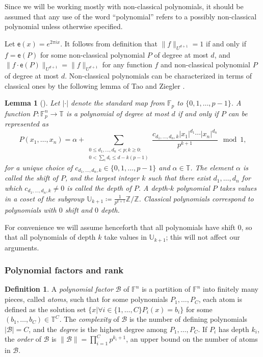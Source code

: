 \documentclass{article}
\theoremstyle{plain}
\newtheorem{lem}[theorem]{Lemma}
\theoremstyle{definition}
\theoremstyle{definition}
\newtheorem{defn}[theorem]{Definition}
\theoremstyle{remark}
\numberwithin{equation}{section}
\newcommand{\FF}{\mathbb{F}}
\newcommand{\F}{\mathbb{F}}
\newcommand{\T}{\mathbb{T}}
\newcommand{\TT}{\mathbb{T}}
\newcommand{\U}{\mathbb{U}}
\newcommand{\UU}{\mathbb{U}}
\newcommand{\Z}{\mathbb{Z}}
\newcommand{\expo}[1]{{\mathsf{e}\left(#1\right)}}
\begin{document}
Since we will be working mostly with non-classical polynomials, it should be assumed that any use of the word ``polynomial'' refers to a possibly non-classical polynomial unless otherwise specified. 

Let $\expo{x}=e^{2\pi i x}$. It follows from definition that $\|f\|_{U^{d+1}}=1$ if and only if $f=\expo{P}$ for some non-classical polynomial $P$ of degree at most $d$, and $\|f\cdot \expo{P}\|_{U^{d+1}}=\|f\|_{U^{d+1}}$ for any function $f$ and non-classical polynomial $P$ of degree at most $d$. Non-classical polynomials can be characterized in terms of classical ones by the following lemma of Tao and Ziegler \cite{tao2012inverse}.

\begin{lem}[{\cite[Lemma~1.7]{tao2012inverse}}]\label{lem:nonclassrep}
Let $|\cdot|$ denote the standard map from $\FF_p$ to $\{0,1,\dots,p-1\}$. A function $P: \F_p^n \to \T$ is a polynomial of degree at most $d$ if and
only if $P$ can be represented as
$$P(x_1,\dots,x_n) = \alpha + \sum_{\substack{0\leq d_1,\dots,d_n< p; k \geq 0:
  \\ 0 < \sum_i d_i \leq d - k(p-1)}} \frac{ c_{d_1,\dots, d_n,
  k} |x_1|^{d_1}\cdots |x_n|^{d_n}}{p^{k+1}} \mod 1,
$$
for a unique choice of $c_{d_1,\dots,d_n,k} \in \{0,1,\dots,p-1\}$
and $\alpha \in \T$.  The element $\alpha$ is called the {\em
  shift} of $P$, and the largest integer $k$ such that there
exist $d_1,\dots,d_n$ for which $c_{d_1,\dots,d_n,k} \neq 0$ is called
the {\em depth} of $P$. A depth-$k$ polynomial $P$ takes values in a coset of the subgroup $\U_{k+1}\coloneqq \frac{1}{p^{k+1}} \Z/\Z$. Classical polynomials correspond to
polynomials with $0$ shift and $0$ depth.
\end{lem}

For convenience we will assume henceforth that all polynomials have shift $0$, so that all polynomials of depth $k$ take values in  $\UU_{k+1}$; this will not affect our arguments.

\subsubsection{Polynomial factors and rank}

\begin{defn}
A \emph{polynomial factor} $\mathcal{B}$ of $\FF^n$ is a partition of $\FF^n$ into finitely many pieces, called \emph{atoms}, such that for some polynomials $P_1,\dots,P_C$, each atom is defined as the solution set $\{x|\forall i\in\{1,\dots,C\} P_i(x)=b_i\}$ for some $(b_1,\dots,b_C)\in \TT^C$. The \emph{complexity} of $\mathcal{B}$ is the number of defining polynomials $|\mathcal{B}|=C$, and the \emph{degree} is the highest degree among $P_1,\dots,P_C$. If $P_i$ has depth $k_i$, the \emph{order} of $\mathcal{B}$ is $\|\mathcal{B}\|=\prod_{i=1}^C p^{k_i+1}$, an upper bound on the number of atoms in $\mathcal{B}$.
\end{defn}
\end{document}
